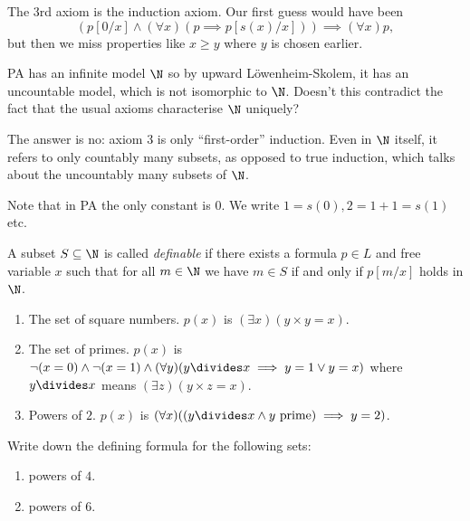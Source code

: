 \documentclass[a4paper]{article}
\begin{document}
\begin{note}
  The 3rd axiom is the induction axiom. Our first guess would have been
  \[
    (p[0/x] \land (\forall x) (p \implies p[s(x)/x])) \implies (\forall x) p,
  \]
  but then we miss properties like \(x \geq y\) where \(y\) is chosen earlier.
\end{note}

PA has an infinite model \(\N\) so by upward Löwenheim-Skolem, it has an uncountable model, which is not isomorphic to \(\N\). Doesn't this contradict the fact that the usual axioms characterise \(\N\) uniquely?

The answer is no: axiom 3 is only ``first-order'' induction. Even in \(\N\) itself, it refers to only countably many subsets, as opposed to true induction, which talks about the uncountably many subsets of \(\N\).

Note that in PA the only constant is \(0\). We write \(1 = s(0), 2 = 1 + 1 = s(1)\) etc.

\begin{definition}[Definable]
  A subset \(S \subseteq \N\) is called \emph{definable} if there exists a formula \(p \in L\) and free variable \(x\) such that for all \(m \in \N\) we have \(m \in S\) if and only if \(p[m/x]\) holds in \(\N\).
\end{definition}

\begin{eg}\leavevmode
  \begin{enumerate}
  \item The set of square numbers. \(p(x)\) is \((\exists x) (y \times y = x)\).
  \item The set of primes. \(p(x)\) is \(\neg (x = 0) \land \neg (x = 1) \land (\forall y) (y \divides x \implies y = 1 \lor y = x)\) where \(y \divides x\) means \((\exists z) (y \times z = x)\). 
  \item Powers of \(2\). \(p(x)\) is \((\forall x) ((y \divides x \land y \text{ prime}) \implies y = 2)\).
  \end{enumerate}
\end{eg}

\begin{ex}
  Write down the defining formula for the following sets:
  \begin{enumerate}
  \item powers of \(4\).
  \item powers of \(6\).
  \end{enumerate}
\end{ex}
\end{document}
